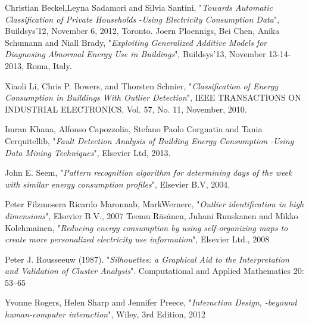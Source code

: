 \begin{thebibliography}{100}
Christian Beckel,Leyna Sadamori and Silvia Santini, "\emph{Towards Automatic Classification of Private Households -Using Electricity Consumption Data}", Buildsys’12, November 6, 2012, Toronto.
 Joern Ploennigs, Bei Chen, Anika Schumann and Niall Brady, "\emph{Exploiting Generalized Additive Models for Diagnosing Abnormal Energy Use in Buildings}", Buildsys’13, November 13-14-2013, Roma, Italy.

Xiaoli Li, Chris P. Bowers, and Thorsten Schnier, "\emph{Classification of Energy Consumption in Buildings With Outlier Detection}", IEEE TRANSACTIONS ON INDUSTRIAL ELECTRONICS, Vol. 57, No. 11, November, 2010.

Imran Khana, Alfonso Capozzolia, Stefano Paolo Corgnatia and Tania Cerquitellib, "\emph{Fault Detection Analysis of Building Energy Consumption -Using Data Mining Techniques}", Elsevier Ltd, 2013.

John E. Seem, "\emph{Pattern recognition algorithm for determining days of the week with similar energy consumption profiles}", Elsevier B.V, 2004.


Peter Filzmosera Ricardo Maronnab, MarkWernerc, "\emph{Outlier identification in high dimensions}", Elsevier B.V., 2007
 Teemu Räsänen, Juhani Ruuskanen and Mikko Kolehmainen, "\emph{Reducing energy consumption by using self-organizing maps to create more personalized electricity use information}", Elsevier Ltd., 2008

Peter J. Rousseeuw (1987). "\emph{Silhouettes: a Graphical Aid to the Interpretation and Validation of Cluster Analysis}". Computational and Applied Mathematics 20: 53–65

Yvonne Rogers, Helen Sharp and Jennifer Preece, "\emph{Interaction Design, -beyound human-computer interaction}", Wiley, 3rd Edition, 2012

\end{thebibliography}
